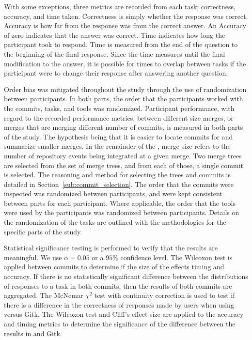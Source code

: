 With some exceptions, three metrics are recorded from each task;
correctness, accuracy, and time taken. Correctness is simply whether the
response was correct. Accuracy is how far from the response was from the
correct answer. An Accuracy of zero indicates that the answer was
correct. Time indicates how long the participant took to respond. Time
is measured from the end of the question to the beginning of the final
response. Since the time measures until the final modification to the
answer, it is possible for times to overlap between tasks if the
participant were to change their response after answering another
question.

Order bias was mitigated throughout the study through the use of
randomization between participants. In both parts, the order that the
participants worked with the commits, tasks, and tools was randomized.
Participant performance, with regard to the recorded performance
metrics, between different size merges, or merges that are merging
different number of commits, is measured in both parts of the study. The
hypothesis being that it is easier to locate commits for and summarize
smaller merges. In the remainder of the \paper{}, merge size refers to
the number of repository events being integrated at a given merge. Two
merge trees are selected from the set of merge trees, and from each of
those, a single commit is selected. The reasoning and method for
selecting the trees and commits is detailed in
Section~\ref{sub:commit_selection}. The order that the commits were
inspected was randomized between participants, and were kept consistent
between parts for each participant. Where applicable, the order that the
tools were used by the participants was randomized between participants.
Details on the randomization of the tasks are outlined with the
methodologies for the specific parts of the study.

Statistical significance testing is performed to verify that the results
are meaningful. We use $\alpha = 0.05$ or a $95\%$ confidence level. The
Wilcoxon test\cite{Wilcoxon45} is applied between commits to determine
if the size of the \mt effects timing and accuracy. If there is no
statistically significant difference between the distributions of
responses to a task in both commits, then the results of both commits
are aggregated. The McNemar $\chi^2$ test\cite{McNemar1947} with
continuity correction is used to test if there is a difference in the
correctness of responses made by users when using \tool{} versus Gitk.
The Wilcoxon test\cite{Wilcoxon45} and Cliff's effect size\cite{Cliff93}
are applied to the accuracy and timing metrics to determine the
significance of the difference between the results in \tool{} and Gitk.

